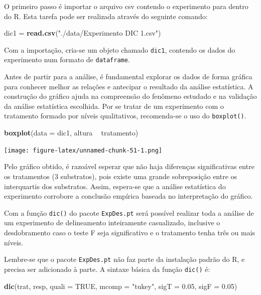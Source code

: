 \documentclass[
]{article}
\newenvironment{Shaded}{\begin{snugshade}}{\end{snugshade}}
\newcommand{\DataTypeTok}[1]{\textcolor[rgb]{0.13,0.29,0.53}{#1}}
\newcommand{\FloatTok}[1]{\textcolor[rgb]{0.00,0.00,0.81}{#1}}
\newcommand{\KeywordTok}[1]{\textcolor[rgb]{0.13,0.29,0.53}{\textbf{#1}}}
\newcommand{\NormalTok}[1]{#1}
\newcommand{\OperatorTok}[1]{\textcolor[rgb]{0.81,0.36,0.00}{\textbf{#1}}}
\newcommand{\OtherTok}[1]{\textcolor[rgb]{0.56,0.35,0.01}{#1}}
\newcommand{\StringTok}[1]{\textcolor[rgb]{0.31,0.60,0.02}{#1}}
\begin{document}
O primeiro passo é importar o arquivo csv contendo o experimento para dentro do R. Esta tarefa pode ser realizada através do seguinte comando:

\begin{Shaded}
\begin{Highlighting}[]
\NormalTok{dic1 =}\StringTok{ }\KeywordTok{read.csv}\NormalTok{(}\StringTok{"./data/Experimento DIC 1.csv"}\NormalTok{)}
\end{Highlighting}
\end{Shaded}

Com a importação, cria-se um objeto chamado \texttt{dic1}, contendo os dados do experimento num formato de \texttt{dataframe}.

Antes de partir para a análise, é fundamental explorar os dados de forma gráfica para conhecer melhor as relações e antecipar o resultado da análise estatística. A construção do gráfico ajuda na compreensão do fenômeno estudado e na validação da análise estatística escolhida. Por se tratar de um experimento com o tratamento formado por níveis qualitativos, recomenda-se o uso do \texttt{boxplot()}.

\begin{Shaded}
\begin{Highlighting}[]
\KeywordTok{boxplot}\NormalTok{(}\DataTypeTok{data =}\NormalTok{ dic1, altura }\OperatorTok{~}\StringTok{ }\NormalTok{tratamento)}
\end{Highlighting}
\end{Shaded}

\texttt{[image: figure-latex/unnamed-chunk-51-1.png]}

Pelo gráfico obtido, é razoável esperar que não haja diferenças significativas entre os tratamentos (3 substratos), pois existe uma grande sobreposição entre os interquartis dos substratos. Assim, espera-se que a análise estatística do experimento corrobore a conclusão empírica baseada no interpretação do gráfico.

Com a função \texttt{dic()} do pacote \texttt{ExpDes.pt} será possível realizar toda a análise de um experimento de delineamento inteiramente casualizado, inclusive o desdobramento caso o teste F seja significativo e o tratamento tenha três ou mais níveis.

Lembre-se que o pacote \texttt{ExpDes.pt} não faz parte da instalação padrão do R, e precisa ser adicionado à parte. A sintaxe básica da função \texttt{dic()} é:

\begin{Shaded}
\begin{Highlighting}[]
\KeywordTok{dic}\NormalTok{(trat, resp, }\DataTypeTok{quali =} \OtherTok{TRUE}\NormalTok{, }\DataTypeTok{mcomp =} \StringTok{"tukey"}\NormalTok{, }\DataTypeTok{sigT =} \FloatTok{0.05}\NormalTok{, }\DataTypeTok{sigF =} \FloatTok{0.05}\NormalTok{)}
\end{Highlighting}
\end{Shaded}
\end{document}
